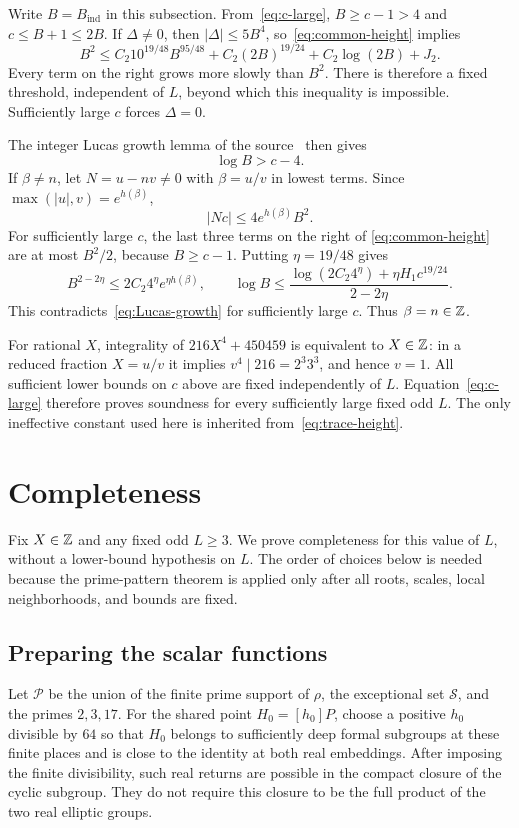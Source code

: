 \documentclass[11pt,a4paper]{article}
\begin{document}
Write $B=B_{\mathrm{ind}}$ in this subsection. From~\eqref{eq:c-large},
$B\ge c-1>4$ and $c\le B+1\le2B$. If $\Delta\ne0$, then
$|\Delta|\le5B^4$, so~\eqref{eq:common-height} implies
\[
 B^2\le C_2 10^{19/48}B^{95/48}
       +C_2(2B)^{19/24}+C_2\log(2B)+J_2.
\]
Every term on the right grows more slowly than $B^2$. There is
therefore a fixed threshold, independent of $L$, beyond which this
inequality is impossible. Sufficiently large $c$ forces
$\Delta=0$.

The integer Lucas growth lemma of the source~\cite{PointSource}
then gives
\begin{equation}\label{eq:Lucas-growth}
                              \log B>c-4.
\end{equation}
If $\beta\ne n$, let $N=u-nv\ne0$ with $\beta=u/v$ in lowest
terms. Since $\max(|u|,v)=e^{h(\beta)}$,
\[
                         |Nc|\le4e^{h(\beta)}B^2.
\]
For sufficiently large $c$, the last three terms on the right of
\eqref{eq:common-height} are at most $B^2/2$, because $B\ge c-1$.
Putting $\eta=19/48$ gives
\[
 B^{2-2\eta}\le2C_2 4^\eta e^{\eta h(\beta)},
 \qquad
 \log B\le\frac{\log(2C_2 4^\eta)+\eta H_1c^{19/24}}
                         {2-2\eta}.
\]
This contradicts~\eqref{eq:Lucas-growth} for sufficiently large $c$.
Thus $\beta=n\in\mathbb Z$.

For rational $X$, integrality of $216X^4+450459$ is equivalent
to $X\in\mathbb Z$: in a reduced fraction $X=u/v$ it implies
$v^4\mid216=2^3 3^3$, and hence $v=1$.
All sufficient lower bounds on $c$ above are fixed independently
of $L$. Equation~\eqref{eq:c-large} therefore proves soundness
for every sufficiently large fixed odd $L$. The only ineffective
constant used here is inherited from~\eqref{eq:trace-height}.

\section{Completeness}

Fix $X\in\mathbb Z$ and any fixed odd $L\ge3$. We prove completeness
for this value of $L$, without a lower-bound hypothesis on $L$.
The order of choices below is needed because the prime-pattern
theorem is applied only after all roots, scales, local neighborhoods,
and bounds are fixed.

\subsection{Preparing the scalar functions}

Let $\mathcal P$ be the union of the finite prime support of $\rho$,
the exceptional set $\mathcal S$, and the primes $2,3,17$.
For the shared point
$H_0=[h_0]P$, choose a positive $h_0$ divisible by $64$ so that
$H_0$ belongs to sufficiently deep formal subgroups at these finite
places and is close to the identity at both real embeddings.
After imposing the finite divisibility, such real returns are possible
in the compact closure of the cyclic subgroup. They do not require
this closure to be the full product of the two real elliptic groups.
\end{document}
